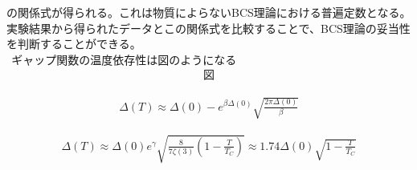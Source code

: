 \documentclass[dvipdfmx, 11pt, a4paper]{jsarticle}
\numberwithin{equation}{section}
\theoremstyle{definition}
\begin{document}
    の関係式が得られる。これは物質によらないBCS理論における普遍定数となる。実験結果から得られたデータとこの関係式を比較することで、BCS理論の妥当性を判断することができる。\\
    $\ \ $ギャップ関数の温度依存性は図のようになる
    \begin{align}
        \textbf{図}
    \end{align}
    \begin{note}[絶対零度付近のギャップ関数]
        \begin{align}
            \Delta(T) \approx \Delta(0) - e^{\beta \Delta(0)} \sqrt{\frac{2\pi \Delta(0)}{\beta}}
        \end{align}
    \end{note}
    \begin{derivationBox}
        
    \end{derivationBox}
    \begin{note}[転移温度付近のギャップ関数]
        \begin{align}
            \Delta(T) \approx \Delta(0) e^{\gamma} \sqrt{\frac{8}{7\zeta(3)}\left( 1 - \frac{T}{T_C} \right)} \approx 1.74 \Delta(0) \sqrt{1- \frac{T}{T_C}}
        \end{align}
    \end{note}
\end{document}
